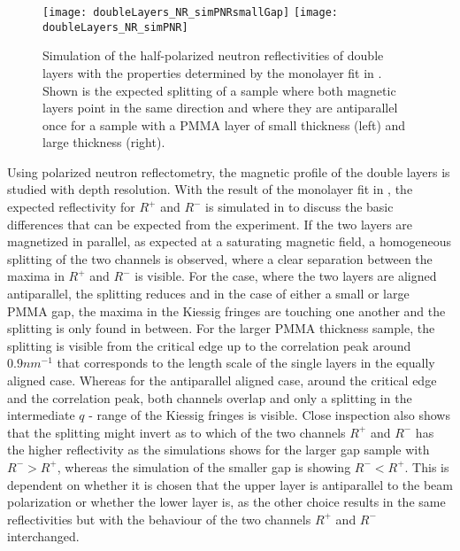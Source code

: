 \documentclass[\main/dresen_thesis.tex]{subfiles}
\begin{document}
  \label{sec:doubleLayers:pnr}

  \begin{figure}[tb]
    \centering
    \texttt{[image: doubleLayers\_NR\_simPNRsmallGap]}
    \texttt{[image: doubleLayers\_NR\_simPNR]}
    \caption{\label{fig:doubleLayers:pnrSimulation}Simulation of the half-polarized neutron reflectivities of double layers with the properties determined by the monolayer fit in . Shown is the expected splitting of a sample where both magnetic layers point in the same direction and where they are antiparallel once for a sample with a PMMA layer of small thickness (left) and large thickness (right).}
  \end{figure}

  Using polarized neutron reflectometry, the magnetic profile of the double layers is studied with depth resolution.
  With the result of the monolayer fit in , the expected reflectivity for $R^{+}$ and $R^{-}$ is simulated in  to discuss the basic differences that can be expected from the experiment.
  If the two layers are magnetized in parallel, as expected at a saturating magnetic field, a homogeneous splitting of the two channels is observed, where a clear separation between the maxima in $R^{+}$ and $R^{-}$ is visible.
  For the case, where the two layers are aligned antiparallel, the splitting reduces and in the case of  either a small or large PMMA gap, the maxima in the Kiessig fringes are touching one another and the splitting is only found in between.
  For the larger PMMA thickness sample, the splitting is visible from the critical edge up to the correlation peak around $0.9 \unit{nm^{-1}}$ that corresponds to the length scale of the single layers in the equally aligned case.
  Whereas for the antiparallel aligned case, around the critical edge and the correlation peak, both channels overlap and only a splitting in the intermediate $q$ - range of the Kiessig fringes is visible.
  Close inspection also shows that the splitting might invert as to which of the two channels $R^{+}$ and $R^{-}$ has the higher reflectivity as the simulations shows for the larger gap sample with $R^{-} > R^{+}$, whereas the simulation of the smaller gap is showing $R^{-} < R^{+}$.
  This is dependent on whether it is chosen that the upper layer is antiparallel to the beam polarization or whether the lower layer is, as the other choice results in the same reflectivities but with the behaviour of the two channels $R^{+}$ and $ R^{-}$ interchanged.
  \\
\end{document}
